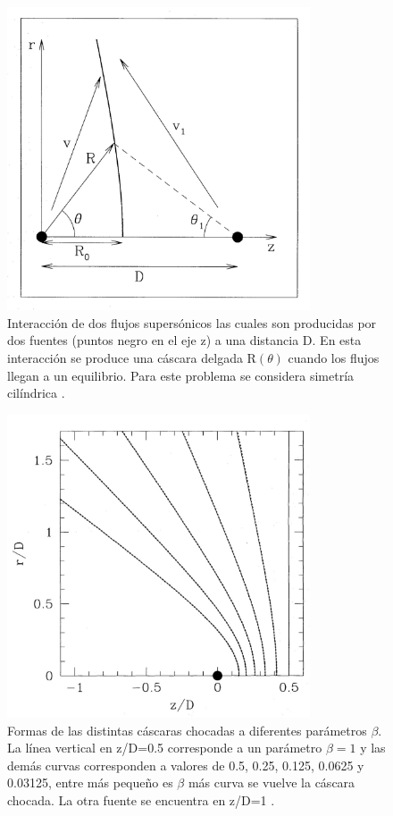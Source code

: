 \documentclass{book}
\begin{document}
\begin{figure}[h]
    \centering    \includegraphics[width=0.8\textwidth]{images Chapter 2/C2_Canto.jpg}
    \caption{Interacción de dos flujos supersónicos las cuales son producidas por dos fuentes (puntos negro en el eje z) a una distancia D. En esta interacción se produce una cáscara delgada R$(\theta)$ cuando los flujos llegan a un equilibrio. Para este problema se considera simetría cilíndrica \citep{Canto:1996}.}
    \label{fig:Canto1}
\end{figure}

\begin{figure}[h]
    \centering    \includegraphics[width=0.8\textwidth]{images Chapter 2/C2_Canto2.jpg}
    \caption{Formas de las distintas cáscaras chocadas a diferentes parámetros $\beta$. La línea vertical en z/D=0.5 corresponde a un parámetro $\beta=1$ y las demás curvas corresponden a valores de 0.5, 0.25, 0.125, 0.0625 y 0.03125, entre más pequeño es $\beta$ más curva se vuelve la cáscara chocada. La otra fuente se encuentra en z/D=1 \citep{Canto:1996}.}
    \label{fig:Canto2}
\end{figure}
\end{document}
